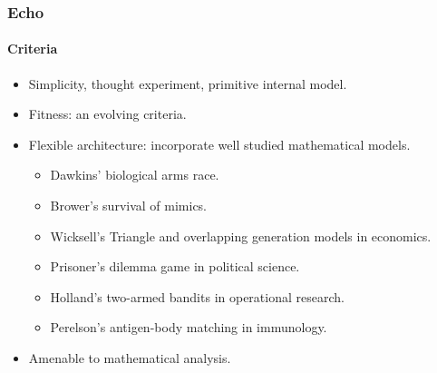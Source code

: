 \frame
{
	\frametitle{Echo}
	\framesubtitle{Criteria}

	\begin{itemize}
		\item Simplicity, thought experiment, primitive internal model.
		\item Fitness: an evolving criteria.
		\item Flexible architecture: incorporate well studied mathematical models.
		\begin{itemize}
			\item Dawkins' biological arms race.
			\item Brower's survival of mimics.
			\item Wicksell's Triangle and overlapping generation models in economics.
			\item Prisoner's dilemma game in political science.
			\item Holland's two-armed bandits in operational research.
			\item Perelson's antigen-body matching in immunology.
		\end{itemize}
		\item Amenable to mathematical analysis.
	\end{itemize}
}